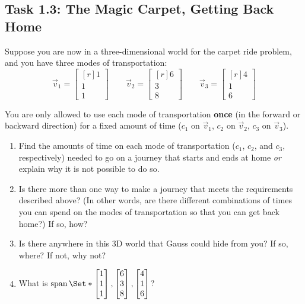 \documentclass{problemset}
\DeclareMathOperator{\Span}{span}
\newcommand{\mat}[1]{\begin{bmatrix*}[r]#1\end{bmatrix*}}
\begin{document}
\begin{iola}
\section*{Task 1.3: The Magic Carpet, Getting Back Home}

Suppose you are now in a three-dimensional world for the carpet
ride problem, and you have three modes of transportation:
\[
	\vec v_1 = \mat{1 \\1 \\ 1}\qquad
	\vec v_2 = \mat{6 \\3 \\ 8}\qquad
	\vec v_3 = \mat{4 \\1 \\ 6}
\]

You are only allowed to use each mode of transportation \textbf{once}
(in the forward or backward direction) for a fixed amount of time ($c_1$
on $\vec v_1$, $c_2$ on $\vec v_2$, $c_3$ on $\vec v_3$).

\vspace{5mm}


\begin{enumerate}
	\item  Find the amounts of time on each mode of transportation ($c_1$, $c_2$, 
		and $c_3$, respectively) needed to go on a journey that starts and ends 
		at home \emph{or} explain why it is not possible to do so.

	\item Is there more than one way to make a journey that meets the
		requirements described above? (In other words, are there different
		combinations of times you can spend on the modes of transportation so
		that you can get back home?) If so, how?

	\item Is there anywhere in this 3D world that Gauss
		could hide from you? If so, where? If not, why not?

	\item What is $\Span\Set*{\mat{1\\1\\1},\mat{6\\3\\8},\mat{4\\1\\6}}$?

\end{enumerate}
\end{iola}
\end{document}
